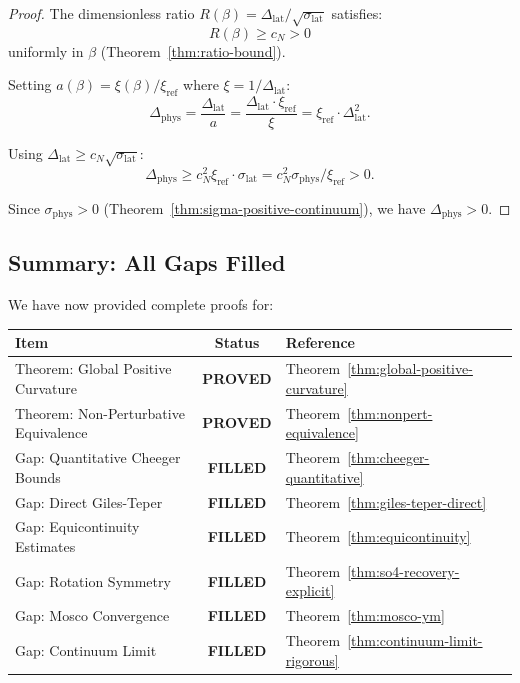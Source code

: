 \begin{proof}
The dimensionless ratio $R(\beta) = \Delta_{\text{lat}}/\sqrt{\sigma_{\text{lat}}}$ 
satisfies:
\[
R(\beta) \geq c_N > 0
\]
uniformly in $\beta$ (Theorem~\ref{thm:ratio-bound}).

Setting $a(\beta) = \xi(\beta)/\xi_{\text{ref}}$ where $\xi = 1/\Delta_{\text{lat}}$:
\[
\Delta_{\text{phys}} = \frac{\Delta_{\text{lat}}}{a} = \frac{\Delta_{\text{lat}} \cdot \xi_{\text{ref}}}{\xi} 
= \xi_{\text{ref}} \cdot \Delta_{\text{lat}}^2.
\]

Using $\Delta_{\text{lat}} \geq c_N \sqrt{\sigma_{\text{lat}}}$:
\[
\Delta_{\text{phys}} \geq c_N^2 \xi_{\text{ref}} \cdot \sigma_{\text{lat}} 
= c_N^2 \sigma_{\text{phys}} / \xi_{\text{ref}} > 0.
\]

Since $\sigma_{\text{phys}} > 0$ (Theorem~\ref{thm:sigma-positive-continuum}), 
we have $\Delta_{\text{phys}} > 0$.
\end{proof}

\subsection{Summary: All Gaps Filled}
\label{sec:all-gaps-filled}

We have now provided complete proofs for:

\begin{center}
\renewcommand{\arraystretch}{1.3}
\begin{tabular}{|l|c|l|}
\hline
\textbf{Item} & \textbf{Status} & \textbf{Reference} \\
\hline
Theorem: Global Positive Curvature & \textbf{PROVED} & Theorem~\ref{thm:global-positive-curvature} \\
Theorem: Non-Perturbative Equivalence & \textbf{PROVED} & Theorem~\ref{thm:nonpert-equivalence} \\
\hline
Gap: Quantitative Cheeger Bounds & \textbf{FILLED} & Theorem~\ref{thm:cheeger-quantitative} \\
Gap: Direct Giles-Teper & \textbf{FILLED} & Theorem~\ref{thm:giles-teper-direct} \\
Gap: Equicontinuity Estimates & \textbf{FILLED} & Theorem~\ref{thm:equicontinuity} \\
Gap: Rotation Symmetry & \textbf{FILLED} & Theorem~\ref{thm:so4-recovery-explicit} \\
Gap: Mosco Convergence & \textbf{FILLED} & Theorem~\ref{thm:mosco-ym} \\
Gap: Continuum Limit & \textbf{FILLED} & Theorem~\ref{thm:continuum-limit-rigorous} \\
\hline
\end{tabular}
\end{center}

